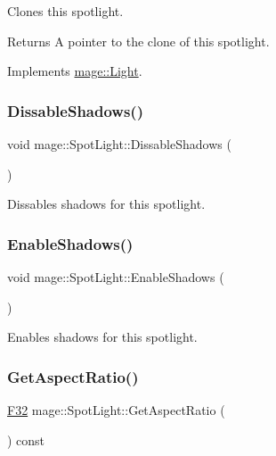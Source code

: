 Clones this spotlight.

\begin{DoxyReturn}{Returns}
A pointer to the clone of this spotlight. 
\end{DoxyReturn}


Implements \hyperlink{classmage_1_1_light_aa613d76a1ebda69efde853d15f75490c}{mage\+::\+Light}.

\hypertarget{classmage_1_1_spot_light_ae43668c2ae4c041b8abf822e15ab2185}{}\label{classmage_1_1_spot_light_ae43668c2ae4c041b8abf822e15ab2185} 
\subsubsection{\texorpdfstring{Dissable\+Shadows()}{DissableShadows()}}
{\footnotesize\ttfamily void mage\+::\+Spot\+Light\+::\+Dissable\+Shadows (\begin{DoxyParamCaption}{ }\end{DoxyParamCaption})\hspace{0.3cm}{\ttfamily [noexcept]}}

Dissables shadows for this spotlight. \hypertarget{classmage_1_1_spot_light_a51694c316560929e6ae49c019d3dc763}{}\label{classmage_1_1_spot_light_a51694c316560929e6ae49c019d3dc763} 
\subsubsection{\texorpdfstring{Enable\+Shadows()}{EnableShadows()}}
{\footnotesize\ttfamily void mage\+::\+Spot\+Light\+::\+Enable\+Shadows (\begin{DoxyParamCaption}{ }\end{DoxyParamCaption})\hspace{0.3cm}{\ttfamily [noexcept]}}

Enables shadows for this spotlight. \hypertarget{classmage_1_1_spot_light_a1cde0db1b5170fc602691652e1dc7f4b}{}\label{classmage_1_1_spot_light_a1cde0db1b5170fc602691652e1dc7f4b} 
\subsubsection{\texorpdfstring{Get\+Aspect\+Ratio()}{GetAspectRatio()}}
{\footnotesize\ttfamily \hyperlink{namespacemage_aa97e833b45f06d60a0a9c4fc22ae02c0}{F32} mage\+::\+Spot\+Light\+::\+Get\+Aspect\+Ratio (\begin{DoxyParamCaption}{ }\end{DoxyParamCaption}) const\hspace{0.3cm}{\ttfamily [noexcept]}}

